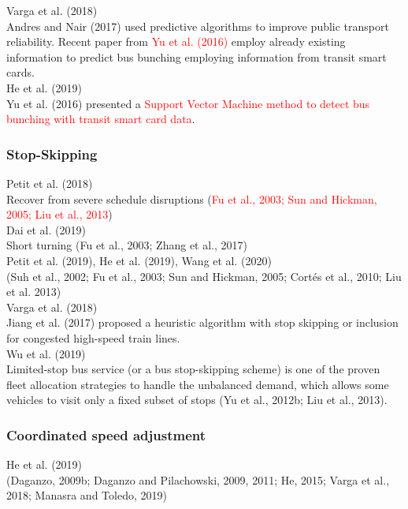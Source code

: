 \documentclass{article}
\begin{document}
\noindent \textrm{Varga et al. (2018)}\\
\textrm{Andres and Nair (2017)} used predictive algorithms 
to improve public transport reliability. 
Recent paper from \textrm{\textcolor{red}{Yu et al. (2016)}} employ already existing information 
to predict bus bunching employing information from transit smart cards.\\

\noindent \textrm{He et al. (2019)}\\
\textrm{Yu et al. (2016)} presented a \textcolor{red}{Support Vector Machine method 
to detect bus bunching with transit smart card data}.\\

\subsubsection*{Stop-Skipping}
\noindent \textrm{Petit et al. (2018)}\\
Recover from severe schedule disruptions 
\textrm{(\textcolor{red}{Fu et al., 2003; Sun and Hickman, 2005; Liu et al., 2013})}\\

\noindent\textrm{Dai et al. (2019)}\\
Short turning \textrm{(Fu et al., 2003; Zhang et al., 2017)}\\

\noindent \textrm{Petit et al. (2019), He et al. (2019), Wang et al. (2020)}\\
\textrm{(Suh et al., 2002; Fu et al., 2003; Sun and Hickman, 2005; Cortés et al., 2010; Liu et al. 2013)}\\

\noindent \textrm{Varga et al. (2018)}\\
\textrm{Jiang et al. (2017)} proposed a heuristic algorithm 
with stop skipping or inclusion for congested high-speed train lines.\\

\noindent Wu et al. (2019)\\
Limited-stop bus service (or a bus stop-skipping scheme) is one of the proven fleet allocation strategies to handle the unbalanced demand, 
which allows some vehicles to visit only a fixed subset of stops (Yu et al., 2012b; Liu et al., 2013).\\

\subsubsection*{Coordinated speed adjustment}
\noindent \textrm{He et al. (2019)}\\
\textrm{(Daganzo, 2009b; Daganzo and Pilachowski, 2009, 2011; 
He, 2015; Varga et al., 2018; Manasra and Toledo, 2019)}\\
\end{document}
